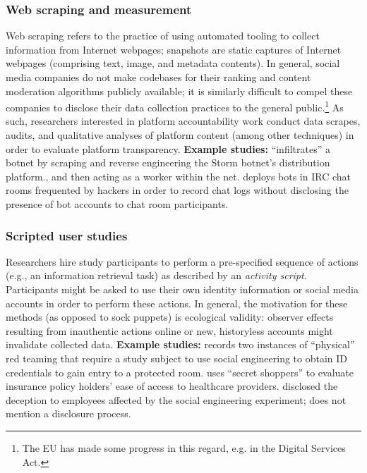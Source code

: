 \subsubsection{Web scraping and measurement}
\label{sec:passive_mmt}
Web scraping refers to the practice of using automated tooling to collect information from Internet webpages; snapshots are static captures of Internet webpages (comprising text, image, and metadata contents). In general, social media companies do not make codebases for their ranking and content moderation algorithms publicly available; it is similarly difficult to compel these companies to disclose their data collection practices to the general public.\footnote{The EU has made some progress in this regard, e.g. in the Digital Services Act.} As such, researchers interested in platform accountability work conduct data scrapes, audits, and qualitative analyses of platform content (among other techniques) in order to evaluate platform transparency. 
\textbf{Example studies:} 
\cite{kreibichSpamCampaignTrail2008} ``infiltrates'' a botnet by scraping and reverse engineering the Storm botnet's distribution platform., and then acting as a worker within the net.
\cite{decary2014policing} deploys bots in IRC chat rooms frequented by hackers in order to record chat logs without disclosing the presence of bot accounts to chat room participants. 

\subsubsection{Scripted user studies}
\label{sec:scripted}
Researchers hire study participants to perform a pre-specified sequence of actions (e.g., an information retrieval task) as described by an \textit{activity script}. Participants might be asked to use their own identity information or social media accounts in order to perform these actions. In general, the motivation for these methods (as opposed to sock puppets) is ecological validity: observer effects resulting from inauthentic actions online or new, historyless accounts might invalidate collected data. 
\textbf{Example studies:} 
\cite{dimkov2010two} records two instances of ``physical'' red teaming that require a study subject to use social engineering to obtain ID credentials to gain entry to a protected room.
\cite{haeder2016secret} uses ``secret shoppers'' to evaluate insurance policy holders' ease of access to healthcare providers. \cite{dimkov2010two} disclosed the deception to employees affected by the social engineering experiment; \cite{haeder2016secret} does not mention a disclosure process.  



